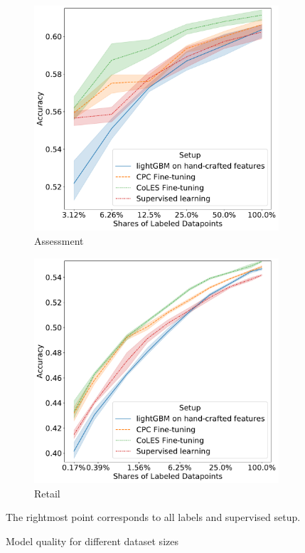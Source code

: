 \documentclass[sigconf, anonymous]{acmart}
\begin{document}
\begin{figure}
\begin{subfigure}{0.25\linewidth}
  \end{subfigure}%
  \begin{subfigure}{0.25\linewidth}
    \caption{Assessment}
    \includegraphics[width=\linewidth]{figures/ss_bowl2019_per.pdf}
  \end{subfigure}%
  \begin{subfigure}{0.25\linewidth}
    \caption{Retail}
    \includegraphics[width=\linewidth]{figures/ss_x5_per.pdf}
  \end{subfigure}
  \caption{Model quality for different dataset sizes} \small{The rightmost point corresponds to all labels and supervised setup.}
  \label{fig-semi-main}
\end{figure}
\end{document}
